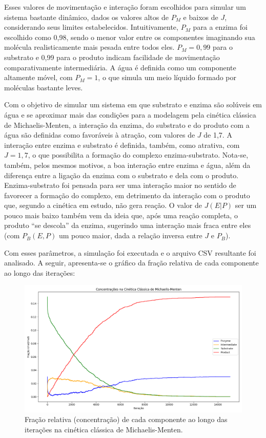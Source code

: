 \documentclass[12pt,oneside]{report}
\begin{document}
Esses valores de movimentação e interação foram escolhidos para simular um sistema bastante dinâmico, dados os valores altos de $P_M$ e baixos de $J$, considerando seus limites estabelecidos. Intuitivamente, $P_M$ para a enzima foi escolhido como 0{,}98, sendo o menor valor entre os componentes imaginando sua molécula realisticamente mais pesada entre todos eles. $P_M = 0{,}99$ para o substrato e 0{,}99 para o produto indicam facilidade de movimentação comparativamente intermediária. A água é definida como um componente altamente móvel, com $P_M = 1$, o que simula um meio líquido formado por moléculas bastante leves.

Com o objetivo de simular um sistema em que substrato e enzima são solúveis em água e se aproximar mais das condições para a modelagem pela cinética clássica de Michaelis-Menten, a interação da enzima, do substrato e do produto com a água são definidas como favoráveis à atração, com valores de $J$ de 1{,}7. A interação entre enzima e substrato é definida, também, como atrativa, com $J = 1{,}7$, o que possibilita a formação do complexo enzima-substrato. Nota-se, também, pelos mesmos motivos, a boa interação entre enzima e água, além da diferença entre a ligação da enzima com o substrato e dela com o produto. Enzima-substrato foi pensada para ser uma interação maior no sentido de favorecer a formação do complexo, em detrimento da interação com o produto que, segundo a cinética em estudo, não gera reação. O valor de $J (E|P)$ ser um pouco mais baixo também vem da ideia que, após uma reação completa, o produto ``se descola'' da enzima, sugerindo uma interação mais fraca entre eles (com $P_B (E,P)$ um pouco maior, dada a relação inversa entre $J$ e $P_B$).

Com esses parâmetros, a simulação foi executada e o arquivo CSV resultante foi analisado. A seguir, apresenta-se o gráfico da fração relativa de cada componente ao longo das iterações:

\begin{figure}[H]
    \centering
    \includegraphics[width=1\textwidth]{MM_conc.png}
    \caption{\small Fração relativa (concentração) de cada componente ao longo das iterações na cinética clássica de Michaelis-Menten.}
    \label{fig:MM_conc}
\end{figure}
\end{document}

